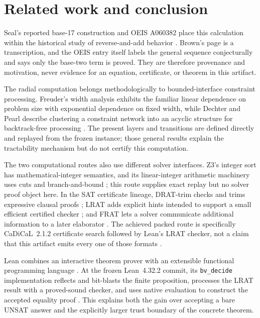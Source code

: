 \documentclass[11pt,twoside]{article}
\theoremstyle{remark}
\begin{document}
\section{Related work and conclusion}
\label{sec:conclusion}
Seal's reported base-17 construction and OEIS A060382 place this calculation
within the historical study of reverse-and-add behavior
\cite{brownSeal,oeisA060382}.  Brown's page is a transcription, and the OEIS
entry itself labels the general sequence conjecturally and says only the
base-two term is proved.  They are therefore provenance and motivation, never
evidence for an equation, certificate, or theorem in this artifact.

The radial computation belongs methodologically to bounded-interface
constraint processing.  Freuder's width analysis exhibits the familiar
linear dependence on problem size with exponential dependence on fixed
width, while Dechter and Pearl describe clustering a constraint network into
an acyclic structure for backtrack-free processing
\cite{Freuder1990,DechterPearl1989}.  The present layers and transitions are
defined directly and replayed from the frozen instance; those general results
explain the tractability mechanism but do not certify this computation.

The two computational routes also use different solver interfaces.  Z3's
integer sort has mathematical-integer semantics, and its linear-integer
arithmetic machinery uses cuts and branch-and-bound \cite{z3Arithmetic}; this
route supplies exact replay but no solver proof object here.  In the SAT
certificate lineage, DRAT-trim checks and trims expressive clausal proofs
\cite{WetzlerHeuleHunt2014}; LRAT adds explicit hints intended to support a
small efficient certified checker \cite{CruzFilipeEtAl2017}; and FRAT lets a
solver communicate additional information to a later elaborator
\cite{BaekCarneiroHeule2022}.  The achieved packed route is specifically
CaDiCaL~2.1.2 certificate search followed by Lean's LRAT checker, not a claim
that this artifact emits every one of those formats \cite{cadical212}.

Lean combines an interactive theorem prover with an extensible functional
programming language \cite{deMouraUllrich2021}.  At the frozen Lean~4.32.2
commit, its \texttt{bv\_decide} implementation reflects and bit-blasts the
finite proposition, processes the LRAT result with a proved-sound checker,
and uses native evaluation to construct the accepted equality proof
\cite{leanBVDecide432}.  This explains both the gain over accepting a bare
UNSAT answer and the explicitly larger trust boundary of the concrete
theorem.
\end{document}
